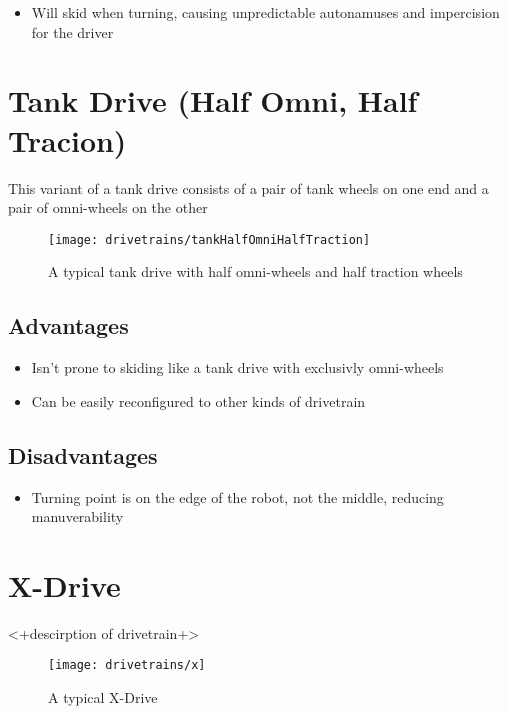 \documentclass[../../main.tex]{subfiles}
\begin{document}
\begin{itemize} \item Will skid when turning, causing unpredictable autonamuses and impercision for the driver \end{itemize}

\section{Tank Drive (Half Omni, Half Tracion)}

This variant of a tank drive consists of a pair of tank wheels on one end and a pair of omni-wheels on the other

\begin{figure}[h] \centering

	\texttt{[image: drivetrains/tankHalfOmniHalfTraction]}
	\caption{A typical tank drive with half omni-wheels and half traction wheels}
	\label{fig:drivetrainTankHalfHalf} \end{figure}

\subsection{Advantages}

\begin{itemize} \item Isn't prone to skiding like a tank drive with exclusivly omni-wheels \item Can be easily reconfigured to other kinds of drivetrain \end{itemize}

\subsection{Disadvantages}

\begin{itemize} \item Turning point is on the edge of the robot, not the middle, reducing manuverability \end{itemize}

\section{X-Drive}

<+descirption of drivetrain+> \begin{figure}[h] \centering

	\texttt{[image: drivetrains/x]}
	\caption{A typical X-Drive} \label{fig:drivetrainX}
	\end{figure}
\end{document}
